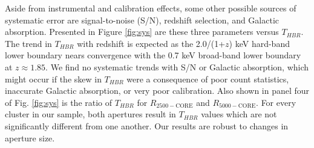 \documentclass[12pt,preprint]{aastex}
\begin{document}
Aside from instrumental and calibration effects, some other possible
sources of systematic error are signal-to-noise (S/N), redshift
selection, and Galactic absorption. Presented in Figure \ref{fig:sys}
are these three parameters versus $T_{HBR}$. The trend in $T_{HBR}$ with redshift
is expected as the 2.0/(1+$z$) keV hard-band lower boundary nears
convergence with the 0.7 keV broad-band lower boundary at
$z \approx 1.85$. We find no systematic trends with S/N or Galactic
absorption, which might occur if the skew in $T_{HBR}$ were a consequence of
poor count statistics, inaccurate Galactic absorption, or very poor
calibration. Also shown in panel four of Fig. \ref{fig:sys} is the
ratio of $T_{HBR}$ for $R_{2500-\mathrm{CORE}}$ and
$R_{5000-\mathrm{CORE}}$. For every cluster in our sample, both apertures
result in $T_{HBR}$ values which are not significantly different from
one another. Our results are robust to changes in aperture size.
\end{document}
